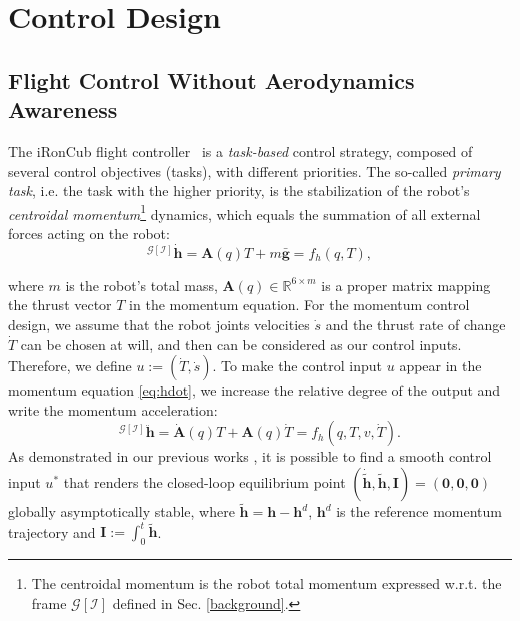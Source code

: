\section{Control Design}
\label{sec:control}


\subsection{Flight Control Without Aerodynamics Awareness}
\label{subsec:Flight-Control-no-aerodyn-forces}
The iRonCub flight controller~\cite{c1, c2} is a \emph{task-based} control strategy, composed of several control objectives (tasks), with different priorities. The so-called \emph{primary task}, i.e. the task with the higher priority, is the stabilization of the robot's \emph{centroidal momentum}\footnote{The centroidal momentum is the robot total momentum expressed w.r.t. the frame $\mathcal{G}[\mathcal{I}]$  defined in Sec. \ref{background}.} dynamics, which equals the summation of all external forces acting on the robot:
%
\begin{equation}
\label{eq:hdot}
   {}^{\mathcal{G}[\mathcal{I}]}\dot{\boldsymbol{h}}=\boldsymbol{A}(q)T+m\bar{\boldsymbol{g}}=f_h(q,T),
\end{equation}

where $m$ is the robot's total mass, $\boldsymbol{A}(q) \in \mathbb{R}^{6 \times m}$ is a proper matrix mapping the thrust vector $T$ in the momentum equation. For the momentum control design, we assume that the robot joints velocities $\dot{s}$ and the thrust rate of change $\dot{T}$ can be chosen at will, and then can be considered as our control inputs. Therefore, we define $u := (\dot{T}, \dot{s})$. To make the control input $u$ appear in the momentum equation \eqref{eq:hdot}, we increase the relative degree of the output and write the momentum acceleration:
%
\begin{equation}
\label{eq:hddot}
   {}^{\mathcal{G}[\mathcal{I}]}\ddot{\boldsymbol{h}}=\dot{\boldsymbol{A}}(q)T+\boldsymbol{A}(q)\dot{T} = f_h(q, T, v, \dot{T}).
\end{equation}
%
As demonstrated in our previous works \cite{c1,c2}, it is possible to find a smooth control input $u^*$ that renders the closed-loop equilibrium point $(\dot{\tilde{\boldsymbol{h}}}, \tilde{\boldsymbol{h}}, \boldsymbol{I}) = (\boldsymbol{0},\boldsymbol{0},\boldsymbol{0})$ globally asymptotically stable, where $\tilde{\boldsymbol{h}} = \boldsymbol{h}-\boldsymbol{h}^d$, $\boldsymbol{h}^d$ is the reference momentum trajectory and $\boldsymbol{I} := \int_0^t \tilde{\boldsymbol{h}}$. 

